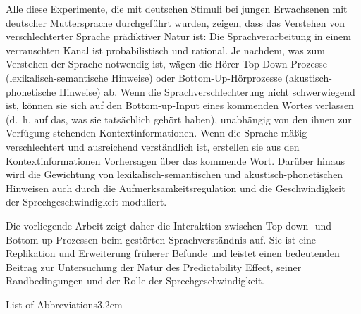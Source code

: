 \documentclass[a4paper, nobind]{templates/ociamthesis}
\begin{document}
\begin{romanpages}
\begin{abstractsecond}
Alle diese Experimente, die mit deutschen Stimuli bei jungen Erwachsenen mit deutscher Muttersprache durchgeführt wurden, zeigen, dass das Verstehen von verschlechterter Sprache prädiktiver Natur ist: Die Sprachverarbeitung in einem verrauschten Kanal ist probabilistisch und rational.
Je nachdem, was zum Verstehen der Sprache notwendig ist, wägen die Hörer Top-Down-Prozesse (lexikalisch-semantische Hinweise) oder Bottom-Up-Hörprozesse (akustisch-phonetische Hinweise) ab.
Wenn die Sprachverschlechterung nicht schwerwiegend ist, können sie sich auf den Bottom-up-Input eines kommenden Wortes verlassen (d.~h. auf das, was sie tatsächlich gehört haben), unabhängig von den ihnen zur Verfügung stehenden Kontextinformationen.
Wenn die Sprache mäßig verschlechtert und ausreichend verständlich ist, erstellen sie aus den Kontextinformationen Vorhersagen über das kommende Wort.
Darüber hinaus wird die Gewichtung von lexikalisch-semantischen und akustisch-phonetischen Hinweisen auch durch die Aufmerksamkeitsregulation und die Geschwindigkeit der Sprechgeschwindigkeit moduliert.

Die vorliegende Arbeit zeigt daher die Interaktion zwischen Top-down- und Bottom-up-Prozessen beim gestörten Sprachverständnis auf. Sie ist eine Replikation und Erweiterung früherer Befunde und leistet einen bedeutenden Beitrag zur Untersuchung der Natur des Predictability Effect, seiner Randbedingungen und der Rolle der Sprechgeschwindigkeit.
\end{abstractsecond}



\flushbottom

\tableofcontents

\listoffigures
	\mtcaddchapter

\listoftables
  \mtcaddchapter
\begin{mclistof}{List of Abbreviations}{3.2cm}


\end{mclistof}
\end{romanpages}
\end{document}
